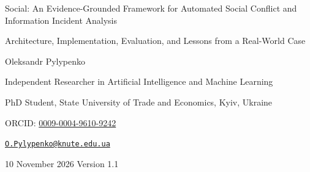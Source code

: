 \documentclass[11pt,a4paper]{article}
\begin{document}
\begin{center}
{\LARGE Social: An Evidence-Grounded Framework for Automated Social Conflict and Information Incident Analysis\par}
\vspace{0.4em}
{\large Architecture, Implementation, Evaluation, and Lessons from a Real-World Case\par}
\vspace{0.8em}
{\large Oleksandr Pylypenko\par}
{\small Independent Researcher in Artificial Intelligence and Machine Learning\par}
{\small PhD Student, State University of Trade and Economics, Kyiv, Ukraine\par}
{\small ORCID: \href{https://orcid.org/0009-0004-9610-9242}{0009-0004-9610-9242}\par}
{\small \href{mailto:O.Pylypenko@knute.edu.ua}{\texttt{O.Pylypenko@knute.edu.ua}}\par}
\vspace{0.4em}
10 November 2026 \textperiodcentered{} Version 1.1
\end{center}
\end{document}
